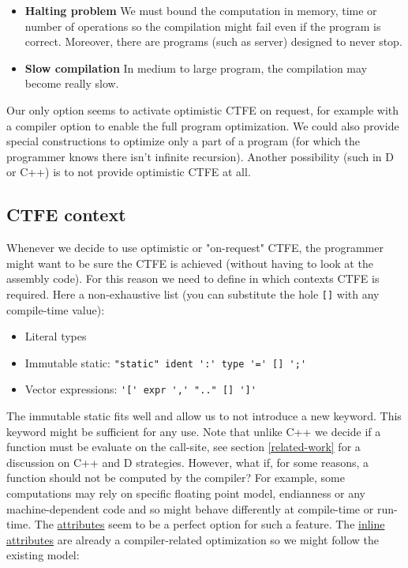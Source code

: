 \documentclass[a4paper,11pt]{article}
\begin{document}
\begin{itemize}
\item \textbf{Halting problem} We must bound the computation in memory, time or number of operations so the compilation might fail even if the program is correct. Moreover, there are programs (such as server) designed to never stop.
\item \textbf{Slow compilation} In medium to large program, the compilation may become really slow.
\end{itemize}

Our only option seems to activate optimistic CTFE on request, for example with a compiler option to enable the full program optimization. We could also provide special constructions to optimize only a part of a program (for which the programmer knows there isn't infinite recursion). Another possibility (such in D or C++) is to not provide optimistic CTFE at all.

\subsection{CTFE context}
\label{ctfe-context}

Whenever we decide to use optimistic or "on-request" CTFE, the programmer might want to be sure the CTFE is achieved (without having to look at the assembly code). For this reason we need to define in which contexts CTFE is required. Here a non-exhaustive list (you can substitute the hole \lstinline{[]} with any compile-time value):

\begin{itemize}
\item Literal types
\item Immutable static: \lstinline[mathescape]{"static" ident ':' type '=' [] ';'}
\item Vector expressions: \lstinline[mathescape]{'[' expr ',' ".." [] ']'}
\end{itemize}

The immutable static fits well and allow us to not introduce a new keyword. This keyword might be sufficient for any use. Note that unlike C++ we decide if a function must be evaluate on the call-site, see section \ref{related-work} for a discussion on C++ and D strategies. However, what if, for some reasons, a function should not be computed by the compiler? For example, some computations may rely on specific floating point model, endianness or any machine-dependent code and so might behave differently at compile-time or run-time. The \href{http://static.rust-lang.org/doc/master/rust.html#attributes}{attributes} seem to be a perfect option for such a feature. The \href{http://static.rust-lang.org/doc/master/rust.html#inline-attributes}{inline attributes} are already a compiler-related optimization so we might follow the existing model:
\end{document}
